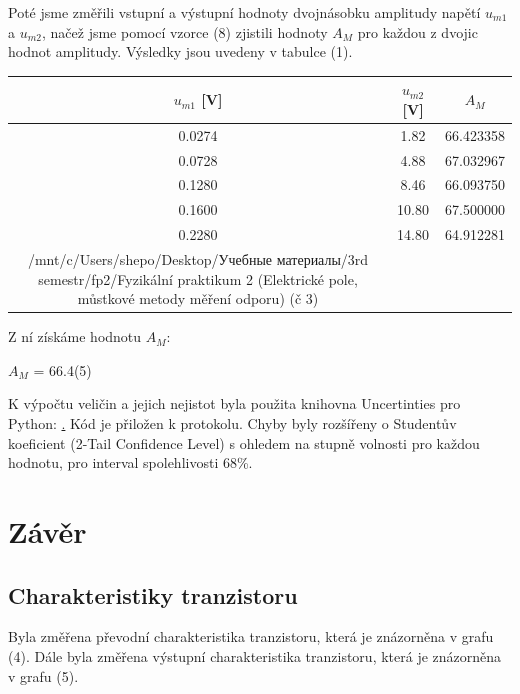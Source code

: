 \documentclass[a4paper,11pt]{article}
\begin{document}
    \hspace{10pt}  
    \begin{minipage}[t]{0.5\textwidth} 
                Poté jsme změřili vstupní a výstupní hodnoty dvojnásobku amplitudy napětí $u_{m1}$ a $u_{m2}$, načež jsme pomocí vzorce (8) zjistili hodnoty $A_M$ pro každou z dvojic hodnot amplitudy. Výsledky jsou uvedeny v tabulce (1). 
                \vspace{10pt}
                \par \centering
                \begin{tabular}{|c|c|c|}
                    \hline
                    $u_{m1}$ [V] & $u_{m2}$ [V] & $A_M$ \\
                    \hline
                    0.0274 & 1.82 & 66.423358 \\
                    \hline
                    0.0728 & 4.88 & 67.032967 \\
                    \hline
                    0.1280 & 8.46 & 66.093750 \\
                    \hline
                    0.1600 & 10.80 & 67.500000 \\
                    \hline
                    0.2280 & 14.80 & 64.912281 \\  
                    \hline
/mnt/c/Users/shepo/Desktop/Учебные материалы/3rd semestr/fp2/Fyzikální praktikum 2 (Elektrické pole, můstkové metody měření odporu) (č 3)                \end{tabular}
                \captionsetup{justification=centering, font=footnotesize}
                \vspace{10pt}
                \raggedright
                \par Z ní získáme hodnotu $A_M$:
                \begin{center}
                    $A_M$ = 66.4(5)
                \end{center}
                K výpočtu veličin a jejich nejistot byla použita knihovna Uncertinties pro Python: \href{pypi.org/project/uncertainties}. Kód je přiložen k protokolu. Chyby byly rozšířeny o Studentův koeficient (2-Tail Confidence Level) s ohledem na stupně volnosti pro každou hodnotu, pro interval spolehlivosti 68\%.
        \section{Závěr}  
            \subsection{Charakteristiky tranzistoru}
                Byla změřena převodní charakteristika tranzistoru, která je znázorněna v grafu (4). Dále byla změřena výstupní charakteristika tranzistoru, která je znázorněna v grafu (5). 
    \end{minipage}
\end{document}

